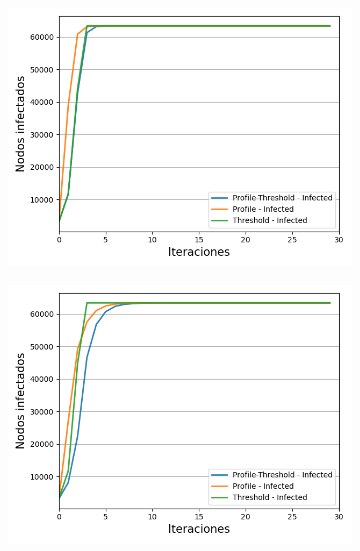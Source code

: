 \documentclass{article}
\begin{document}
\begin{figure}[!tbp]
	\begin{subfigure}[b]{0.5\textwidth}
		\includegraphics[width=\textwidth]{../Images/Fig 1 a).png}
		\caption{}
		\label{fig:f1}
	\end{subfigure}
	\hfill
	\begin{subfigure}[b]{0.5\textwidth}
		\includegraphics[width=\textwidth]{../Images/Fig 1 b).png}
		\caption{}
		\label{fig:f2}
	\end{subfigure}
		\begin{subfigure}[b]{0.5\textwidth}

\end{subfigure}
\end{figure}
\end{document}
